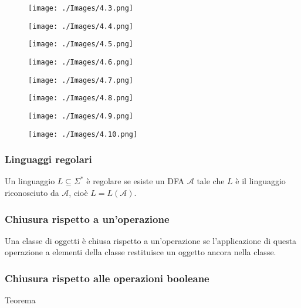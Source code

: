 \begin{figure}[hbpt!]
    \centering
    \texttt{[image: ./Images/4.3.png]}
\end{figure}
\FloatBarrier
\begin{figure}[hbpt!]
    \centering
    \texttt{[image: ./Images/4.4.png]}
\end{figure}
\FloatBarrier
\begin{figure}[hbpt!]
    \centering
    \texttt{[image: ./Images/4.5.png]}
\end{figure}
\FloatBarrier
\begin{figure}[hbpt!]
    \centering
    \texttt{[image: ./Images/4.6.png]}
\end{figure}
\FloatBarrier
\begin{figure}[hbpt!]
    \centering
    \texttt{[image: ./Images/4.7.png]}
\end{figure}
\FloatBarrier
\begin{figure}[hbpt!]
    \centering
    \texttt{[image: ./Images/4.8.png]}
\end{figure}
\FloatBarrier
\begin{figure}[hbpt!]
    \centering
    \texttt{[image: ./Images/4.9.png]}
\end{figure}
\FloatBarrier
\begin{figure}[hbpt!]
    \centering
    \texttt{[image: ./Images/4.10.png]}
\end{figure}
\FloatBarrier

\subsubsection{Linguaggi regolari}
Un linguaggio $L \subseteq \Sigma^{*}$ è regolare se esiste un DFA $\mathcal{A}$ tale che $L$ è il linguaggio riconosciuto da $\mathcal{A}$, cioè $L=L(\mathcal{A})$.

\subsubsection{Chiusura rispetto a un'operazione}
Una classe di oggetti è chiusa rispetto a un'operazione se
l'applicazione di questa operazione a elementi della classe
restituisce un oggetto ancora nella classe.

\subsubsection{Chiusura rispetto alle operazioni booleane}
Teorema

